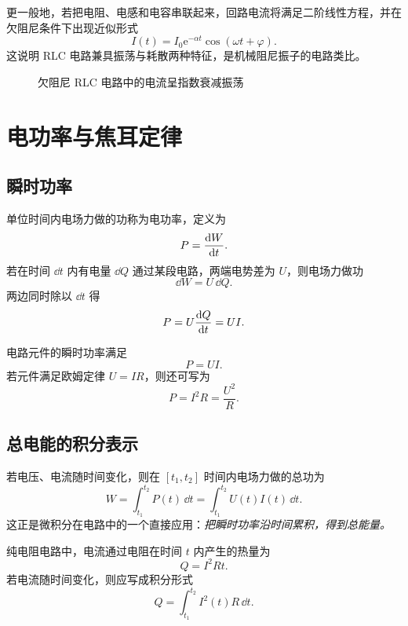 更一般地，若把电阻、电感和电容串联起来，回路电流将满足二阶线性方程，并在欠阻尼条件下出现近似形式
\[
I(t)=I_0\mathrm{e}^{-\alpha t}\cos(\omega t+\varphi).
\]
这说明 RLC 电路兼具振荡与耗散两种特征，是机械阻尼振子的电路类比。

\begin{figure}[htbp]
\centering
{}
\caption{欠阻尼 RLC 电路中的电流呈指数衰减振荡}
\end{figure}

\section{电功率与焦耳定律}

\subsection{瞬时功率}

单位时间内电场力做的功称为电功率，定义为
\[
P=\dv{W}{t}.
\]
若在时间 $\dd t$ 内有电量 $\dd Q$ 通过某段电路，两端电势差为 $U$，则电场力做功
\[
\dd W=U\,\dd Q.
\]
两边同时除以 $\dd t$ 得
\[
P=U\dv{Q}{t}=UI.
\]

\begin{law}[电功率公式]
电路元件的瞬时功率满足
\[
P=UI.
\]
若元件满足欧姆定律 $U=IR$，则还可写为
\[
P=I^2R=\frac{U^2}{R}.
\]
\end{law}

\subsection{总电能的积分表示}

若电压、电流随时间变化，则在 $[t_1,t_2]$ 时间内电场力做的总功为
\[
W=\int_{t_1}^{t_2} P(t)\,\dd t
=\int_{t_1}^{t_2} U(t)I(t)\,\dd t.
\]
这正是微积分在电路中的一个直接应用：\emph{把瞬时功率沿时间累积，得到总能量。}

\begin{law}[焦耳定律]
纯电阻电路中，电流通过电阻在时间 $t$ 内产生的热量为
\[
Q=I^2Rt.
\]
若电流随时间变化，则应写成积分形式
\[
Q=\int_{t_1}^{t_2} I^2(t)R\,\dd t.
\]
\end{law}

